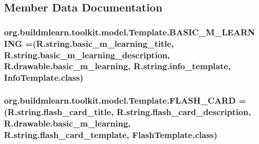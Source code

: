 \subsection{Member Data Documentation}
\hypertarget{enumorg_1_1buildmlearn_1_1toolkit_1_1model_1_1Template_a677ac7115aa6a442f35bdc7e2f44868f}{
\subsubsection[{B\-A\-S\-I\-C\-\_\-\-M\-\_\-\-L\-E\-A\-R\-N\-I\-N\-G}]{\setlength{\rightskip}{0pt plus 5cm}org.\-buildmlearn.\-toolkit.\-model.\-Template.\-B\-A\-S\-I\-C\-\_\-\-M\-\_\-\-L\-E\-A\-R\-N\-I\-N\-G =(R.\-string.\-basic\-\_\-m\-\_\-learning\-\_\-title, R.\-string.\-basic\-\_\-m\-\_\-learning\-\_\-description, R.\-drawable.\-basic\-\_\-m\-\_\-learning, R.\-string.\-info\-\_\-template, Info\-Template.\-class)}}\label{enumorg_1_1buildmlearn_1_1toolkit_1_1model_1_1Template_a677ac7115aa6a442f35bdc7e2f44868f}
\hypertarget{enumorg_1_1buildmlearn_1_1toolkit_1_1model_1_1Template_a320459af7080ce10a9bbca2f60224865}{
\subsubsection[{F\-L\-A\-S\-H\-\_\-\-C\-A\-R\-D}]{\setlength{\rightskip}{0pt plus 5cm}org.\-buildmlearn.\-toolkit.\-model.\-Template.\-F\-L\-A\-S\-H\-\_\-\-C\-A\-R\-D =(R.\-string.\-flash\-\_\-card\-\_\-title, R.\-string.\-flash\-\_\-card\-\_\-description, R.\-drawable.\-basic\-\_\-m\-\_\-learning, R.\-string.\-flash\-\_\-card\-\_\-template, Flash\-Template.\-class)}}\label{enumorg_1_1buildmlearn_1_1toolkit_1_1model_1_1Template_a320459af7080ce10a9bbca2f60224865}

